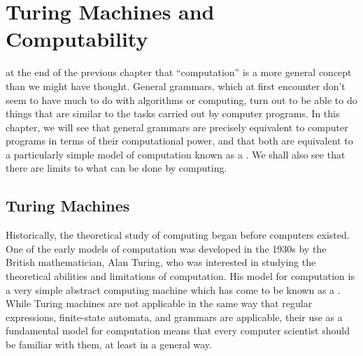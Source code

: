 
\chapter{Turing Machines and Computability}\label{C-turing}

\renewcommand{\b}{{\tt\#}}
\newcommand{\at}{{\tt\char`\@}}

 at the end of the previous chapter that
``computation'' is a more general concept than we might have thought.
General grammars, which at first encounter don't seem to have much
to do with algorithms or computing, turn out to be able to do things
that are similar to the tasks carried out by computer programs.
In this chapter, we will see that general grammars are precisely
equivalent to computer programs in terms of their computational
power, and that both are equivalent to a particularly simple model
of computation known as a .  We shall also see
that there are limits to what can be done by computing.


\section{Turing Machines}\label{S-turing-1}

Historically, the theoretical study of computing began before computers
existed.  One of the early models of computation was developed in the
1930s by the British mathematician, Alan Turing, who was interested in
studying the theoretical abilities and limitations of computation.
His model for computation is a very simple abstract computing machine
which has come to be known as a .  While Turing
machines are not applicable in the same way that regular expressions,
finite-state automata, and grammars are applicable, their use as a
fundamental model for computation means that every computer scientist
should be familiar with them, at least in a general way.

